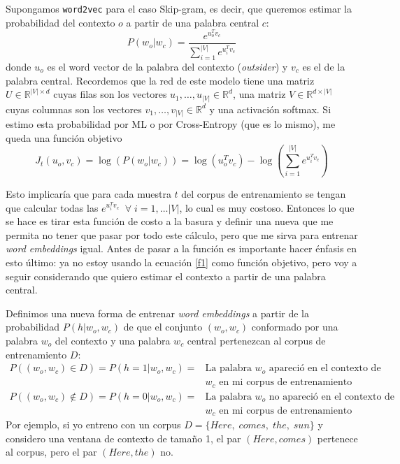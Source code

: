 \documentclass[12pt]{article}
\begin{document}
Supongamos \texttt{word2vec} para el caso Skip-gram, es decir, que queremos estimar la probabilidad del contexto $o$ a partir de una palabra central $c$:
\begin{equation}
P(w_o|w_c) = \frac{e^{u_o^Tv_c}}{\sum_{i=1}^{|V|} e^{u_i^Tv_c}}
\end{equation}
donde $u_o$ es el word vector de la palabra del contexto (\emph{outsider}) y $v_c$ es el de la palabra central. Recordemos que la red de este modelo tiene una matriz $U \in \mathbb{R}^{|V|\times d}$ cuyas filas son los vectores $u_1,\ldots,u_{|V|} \in \mathbb{R}^d$, una matriz $V \in \mathbb{R}^{d \times |V|}$ cuyas columnas son los vectores $v_1,\ldots,v_{|V|} \in \mathbb{R}^d$ y una activación softmax. Si estimo esta probabilidad por ML o por Cross-Entropy (que es lo mismo), me queda una función objetivo
\begin{equation}\label{f1}
J_t(u_o,v_c) = \log\left(P(w_o|w_c)\right) = \log\left(u_o^Tv_c\right) - \log\left(\sum_{i=1}^{|V|} e^{u_i^Tv_c}\right)
\end{equation}

Esto implicaría que para cada muestra $t$ del corpus de entrenamiento se tengan que calcular todas las $e^{u_i^Tv_c}\;\; \forall\; i = 1, \ldots |V|$, lo cual es muy costoso. Entonces lo que se hace es tirar esta función de costo a la basura y definir una nueva que me permita no tener que pasar por todo este cálculo, pero que me sirva para entrenar \emph{word embeddings} igual. Antes de pasar a la función es importante hacer énfasis en esto último: ya no estoy usando la ecuación \ref{f1} como función objetivo, pero voy a seguir considerando que quiero estimar el contexto a partir de una palabra central.

Definimos una nueva forma de entrenar \emph{word embeddings} a partir de la probabilidad $P(h|w_o,w_c)$ de que el conjunto $(w_o,w_c)$ conformado por una palabra $w_o$ del contexto y una palabra $w_c$ central pertenezcan al corpus de entrenamiento $D$:
\begin{align*}
P\left( (w_o,w_c) \in D \right) = P(h = 1 | w_o,w_c) = &\text{La palabra $w_o$ apareció en el contexto de} \\
 & \text{$w_c$ en mi corpus de entrenamiento} \\[.5em]
P\left( (w_o,w_c) \notin D \right) =  P(h = 0 | w_o,w_c) = &\text{La palabra $w_o$ no apareció en el contexto de} \\
& \text{$w_c$ en mi corpus de entrenamiento}
\end{align*}
Por ejemplo, si yo entreno con un corpus $D = \{Here,\; comes,\; the,\; sun\}$ y considero una ventana de contexto de tamaño 1, el par $(Here,comes)$ pertenece al corpus, pero el par $(Here,the)$ no.
\end{document}
